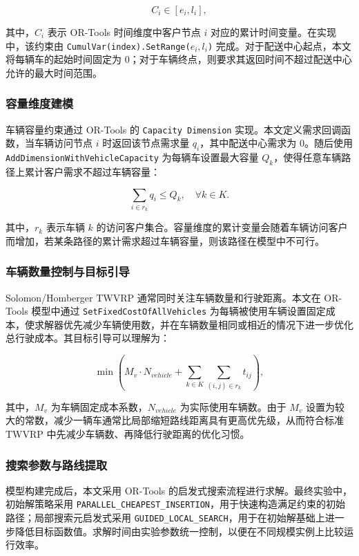 \documentclass[12pt,a4paper,UTF8]{article}
\begin{document}
\[
    C_i \in [e_i,l_i],
\]

其中，$C_i$ 表示 OR-Tools 时间维度中客户节点 $i$ 对应的累计时间变量。在实现中，该约束由 \texttt{CumulVar(index).SetRange($e_i,l_i$)} 完成。对于配送中心起点，本文将每辆车的起始时间固定为 $0$；对于车辆终点，则要求其返回时间不超过配送中心允许的最大时间范围。

\subsubsection{容量维度建模}

车辆容量约束通过 OR-Tools 的 \texttt{Capacity Dimension} 实现。本文定义需求回调函数，当车辆访问节点 $i$ 时返回该节点需求量 $q_i$，其中配送中心需求为 $0$。随后使用 \texttt{AddDimensionWithVehicleCapacity} 为每辆车设置最大容量 $Q_k$，使得任意车辆路径上累计客户需求不超过车辆容量：

\[
    \sum_{i\in r_k} q_i \leq Q_k,
    \quad \forall k\in K.
\]

其中，$r_k$ 表示车辆 $k$ 的访问客户集合。容量维度的累计变量会随着车辆访问客户而增加，若某条路径的累计需求超过车辆容量，则该路径在模型中不可行。

\subsubsection{车辆数量控制与目标引导}

Solomon/Homberger TWVRP 通常同时关注车辆数量和行驶距离。本文在 OR-Tools 模型中通过 \texttt{SetFixedCostOfAllVehicles} 为每辆被使用车辆设置固定成本，使求解器优先减少车辆使用数，并在车辆数量相同或相近的情况下进一步优化总行驶成本。其目标引导可以理解为：

\[
    \min \left(
        M_v \cdot N_{vehicle}
        +
        \sum_{k\in K}\sum_{(i,j)\in r_k} t_{ij}
    \right),
\]

其中，$M_v$ 为车辆固定成本系数，$N_{vehicle}$ 为实际使用车辆数。由于 $M_v$ 设置为较大的常数，减少一辆车通常比局部缩短路线距离具有更高优先级，从而符合标准 TWVRP 中先减少车辆数、再降低行驶距离的优化习惯。

\subsubsection{搜索参数与路线提取}

模型构建完成后，本文采用 OR-Tools 的启发式搜索流程进行求解。最终实验中，初始解策略采用 \texttt{PARALLEL\_CHEAPEST\_INSERTION}，用于快速构造满足约束的初始路径；局部搜索元启发式采用 \texttt{GUIDED\_LOCAL\_SEARCH}，用于在初始解基础上进一步降低目标函数值。求解时间由实验参数统一控制，以便在不同规模实例上比较运行效率。
\end{document}

